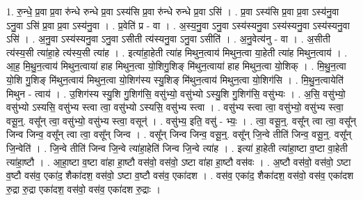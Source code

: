 \documentclass[17pt]{extarticle}
\begin{document}
1. रु॒न्धे॒ प्र॒वा प्र॒वा रु॑न्धे रुन्धे प्र॒वा ऽस्य॑सि प्र॒वा रु॑न्धे रुन्धे प्र॒वा ऽसि॑ । . प्र॒वा ऽस्य॑सि प्र॒वा प्र॒वा ऽस्य॑नु॒वा ऽनु॒वा ऽसि॑ प्र॒वा प्र॒वा ऽस्य॑नु॒वा । . प्र॒वेति॑ प्र - वा । . अ॒स्य॒नु॒वा ऽनु॒वा ऽस्य॑स्यनु॒वा ऽस्य॑स्यनु॒वा ऽस्य॑स्यनु॒वा ऽसि॑ । . अ॒नु॒वा ऽस्य॑स्यनु॒वा ऽनु॒वा ऽसीती त्य॑स्यनु॒वा ऽनु॒वा ऽसीति॑ । . अ॒नु॒वेत्य॑नु - वा । . अ॒सीती त्य॑स्य॒सी त्या॑हा॒हे त्य॑स्य॒सी त्या॑ह । . इत्या॑हा॒हेती त्या॑ह मिथुन॒त्वाय॑ मिथुन॒त्वा या॒हेती त्या॑ह मिथुन॒त्वाय॑ । . आ॒ह॒ मि॒थु॒न॒त्वाय॑ मिथुन॒त्वाया॑ हाह मिथुन॒त्वा यो॒शिगु॒शिङ् मि॑थुन॒त्वाया॑ हाह मिथुन॒त्वा यो॒शिक् । . मि॒थु॒न॒त्वा यो॒शि गु॒शिङ् मि॑थुन॒त्वाय॑ मिथुन॒त्वा यो॒शिग॑स्य स्यु॒शिङ् मि॑थुन॒त्वाय॑ मिथुन॒त्वा यो॒शिग॑सि । . मि॒थु॒न॒त्वायेति॑ मिथुन - त्वाय॑ । . उ॒शिग॑स्य स्यु॒शि गु॒शिग॑सि॒ वसु॑भ्यो॒ वसु॑भ्यो ऽस्यु॒शि गु॒शिग॑सि॒ वसु॑भ्यः । . अ॒सि॒ वसु॑भ्यो॒ वसु॑भ्यो ऽस्यसि॒ वसु॑भ्य स्त्वा त्वा॒ वसु॑भ्यो ऽस्यसि॒ वसु॑भ्य स्त्वा । . वसु॑भ्य स्त्वा त्वा॒ वसु॑भ्यो॒ वसु॑भ्य स्त्वा॒ वसू॒न्॒. वसू᳚न् त्वा॒ वसु॑भ्यो॒ वसु॑भ्य स्त्वा॒ वसून्॑ । . वसु॑भ्य॒ इति॒ वसु॑ - भ्यः॒ । . त्वा॒ वसू॒न्॒. वसू᳚न् त्वा त्वा॒ वसू᳚न् जिन्व जिन्व॒ वसू᳚न् त्वा त्वा॒ वसू᳚न् जिन्व । . वसू᳚न् जिन्व जिन्व॒ वसू॒न्॒. वसू᳚न् जि॒न्वे तीति॑ जिन्व॒ वसू॒न्॒. वसू᳚न् जि॒न्वेति॑ । . जि॒न्वे तीति॑ जिन्व जि॒न्वे त्या॑हा॒हेति॑ जिन्व जि॒न्वे त्या॑ह । . इत्या॑ हा॒हेती त्या॑हा॒ष्टा व॒ष्टा वा॒हेती त्या॑हा॒ष्टौ । . आ॒हा॒ष्टा व॒ष्टा वा॑हा हा॒ष्टौ वस॑वो॒ वस॑वो॒ ऽष्टा वा॑हा हा॒ष्टौ वस॑वः । . अ॒ष्टौ वस॑वो॒ वस॑वो॒ ऽष्टा व॒ष्टौ वस॑व॒ एका॑द॒ शैका॑दश॒ वस॑वो॒ ऽष्टा व॒ष्टौ वस॑व॒ एका॑दश । . वस॑व॒ एका॑द॒ शैका॑दश॒ वस॑वो॒ वस॑व॒ एका॑दश रु॒द्रा रु॒द्रा एका॑दश॒ वस॑वो॒ वस॑व॒ एका॑दश रु॒द्राः । \newline
\end{document}
